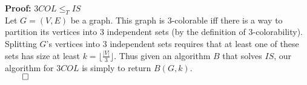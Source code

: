 \documentclass{amsart}
\begin{document}
\noindent
\textbf{Proof:} $3COL \le_T IS$\\

Let $G = (V, E)$ be a graph. This graph is 3-colorable iff there is a way to partition its vertices into 3 independent sets (by the definition of 3-colorability). Splitting $G$'s vertices into 3 independent sets requires that at least one of these sets has size at least $k = \lfloor \frac{|V|}{3} \rfloor$. Thus given an algorithm $B$ that solves $IS$, our algorithm for $3COL$ is simply to return $B(G, k)$.\\

\hfill$\qed$
\end{document}
